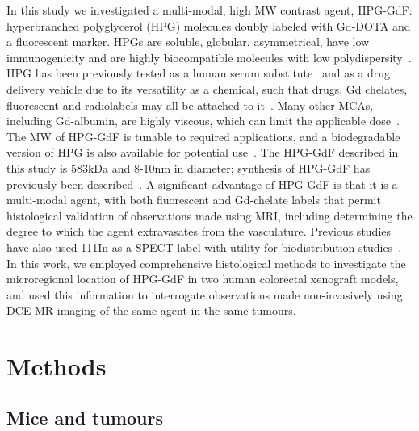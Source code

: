 In this study we investigated a multi-modal, high MW contrast agent, \ac{HPG-GdF}: hyperbranched polyglycerol (HPG) molecules doubly labeled with Gd-DOTA and a fluorescent marker.
HPGs are soluble, globular, asymmetrical, have low immunogenicity and are highly biocompatible molecules with low polydispersity~\cite{Saatchi:2012hc,Kainthan:2006ce,Saatchi:2012gc}.
HPG has been previously tested as a human serum substitute~\cite{Kainthan:2008ek} and as a drug delivery vehicle due to its versatility as a chemical, such that drugs, Gd chelates, fluorescent and radiolabels may all be attached to it~\cite{Shenoi:2013id}.
Many other \ac{MCA}s, including Gd-albumin, are highly viscous, which can limit the applicable dose~\cite{Imranulhaq:2012ij}.
The MW of \ac{HPG-GdF} is tunable to required applications, and a biodegradable version of HPG is also available for potential use~\cite{Shenoi:2013id}.
The \ac{HPG-GdF} described in this study is 583kDa and 8-10nm in diameter; synthesis of \ac{HPG-GdF} has previously been described~\cite{Saatchi:2012hc}.
A significant advantage of \ac{HPG-GdF} is that it is a multi-modal agent, with both fluorescent and Gd-chelate labels that permit histological validation of observations made using MRI, including determining the degree to which the agent extravasates from the vasculature.
Previous studies have also used 111In as a SPECT label with utility for biodistribution studies~\cite{Saatchi:2012hc}.
In this work, we employed comprehensive histological methods to investigate the microregional location of \ac{HPG-GdF} in two human colorectal xenograft models, and used this information to interrogate observations made non-invasively using DCE-MR imaging of the same agent in the same tumours.

\section{Methods}

\subsection{Mice and tumours}

